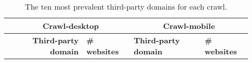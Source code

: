 \begin{table}[ht] 
\caption{The ten most prevalent third-party domains for each crawl.} 
\centering 
\begin{tabular}{|l|ll|ll|} 
\hline\textbf{} & \multicolumn{2}{c|}{\textbf{Crawl-desktop}} & \multicolumn{2}{c|}{\textbf{Crawl-mobile}} \\ \hline 
& \multicolumn{1}{r|}{\textbf{Third-party domain}} & \textbf{\# websites} & \multicolumn{1}{l|}{\textbf{Third-party domain}} & \textbf{\# websites} \\ \hline 
\end{tabular} 
\label{tab:Top10} 
\end{table}